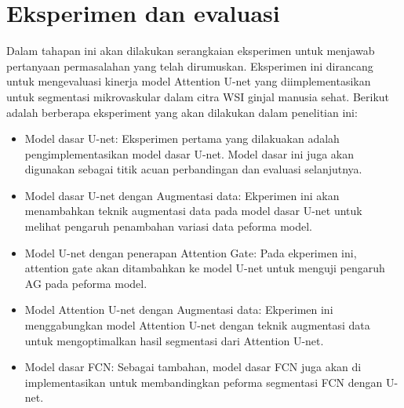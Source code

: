 \section{Eksperimen dan evaluasi}

\noindent Dalam tahapan ini akan dilakukan serangkaian eksperimen untuk menjawab pertanyaan permasalahan yang telah dirumuskan. Eksperimen ini dirancang untuk mengevaluasi kinerja model Attention U-net yang diimplementasikan untuk segmentasi mikrovaskular dalam citra WSI ginjal manusia sehat. Berikut adalah berberapa eksperiment yang akan dilakukan dalam penelitian ini:

\begin{itemize}
	\item Model dasar U-net:
	\noindent Eksperimen pertama yang dilakuakan adalah pengimplementasikan model dasar U-net. Model dasar ini juga akan digunakan sebagai titik acuan perbandingan dan evaluasi selanjutnya.
	
	\item Model dasar U-net dengan Augmentasi data:
	\noindent Ekperimen ini akan menambahkan teknik augmentasi data pada model dasar U-net  untuk melihat pengaruh penambahan variasi data peforma model.

	\item Model U-net dengan penerapan Attention Gate:
	\noindent Pada ekperimen ini, attention gate akan ditambahkan ke model U-net untuk menguji pengaruh AG pada peforma model.
	
	\item Model Attention U-net dengan Augmentasi data:
	\noindent Ekperimen ini menggabungkan model Attention U-net dengan teknik augmentasi data untuk mengoptimalkan hasil segmentasi dari Attention U-net.
	
	\item Model dasar FCN:
	\noindent Sebagai tambahan, model dasar FCN juga akan di implementasikan untuk membandingkan peforma segmentasi FCN dengan U-net.
\end{itemize}

